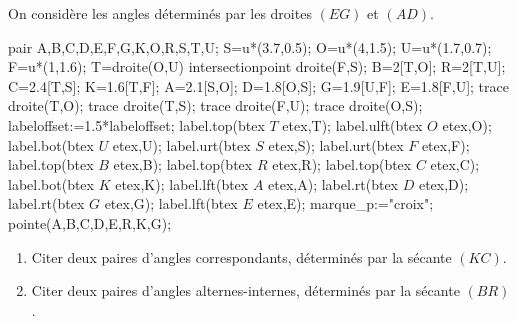 \begin{exercice*}
    On considère les angles déterminés par les droites $(EG)$ et $(AD)$.
    \begin{center}
        \begin{Geometrie}[CoinBG={(-0.5u,-0.5u)},CoinHD={(6u,3u)}]
            pair A,B,C,D,E,F,G,K,O,R,S,T,U;
            S=u*(3.7,0.5);
            O=u*(4,1.5);
            U=u*(1.7,0.7);
            F=u*(1,1.6);
            T=droite(O,U) intersectionpoint droite(F,S);
            B=2[T,O];
            R=2[T,U];
            C=2.4[T,S];
            K=1.6[T,F];
            A=2.1[S,O];
            D=1.8[O,S];
            G=1.9[U,F];
            E=1.8[F,U];
            trace droite(T,O);
            trace droite(T,S);        
            trace droite(F,U);
            trace droite(O,S);
            labeloffset:=1.5*labeloffset;
            label.top(btex $T$ etex,T);
            label.ulft(btex $O$ etex,O);
            label.bot(btex $U$ etex,U);
            label.urt(btex $S$ etex,S);
            label.urt(btex $F$ etex,F);
            label.top(btex $B$ etex,B);
            label.top(btex $R$ etex,R);
            label.top(btex $C$ etex,C);
            label.bot(btex $K$ etex,K);
            label.lft(btex $A$ etex,A);
            label.rt(btex $D$ etex,D);
            label.rt(btex $G$ etex,G);
            label.lft(btex $E$ etex,E);
            marque_p:="croix";
            pointe(A,B,C,D,E,R,K,G);
        \end{Geometrie}
    \end{center}
    \begin{enumerate}
        \item Citer deux paires d'angles correspondants, déterminés par la sécante $(KC)$.
        \item Citer deux paires d'angles alternes-internes, déterminés par la sécante $(BR)$.
    \end{enumerate}
\end{exercice*}
